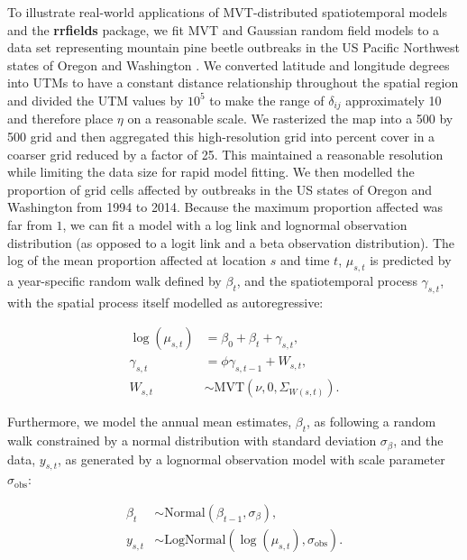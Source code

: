 \documentclass[12pt,english]{article}
\begin{document}
\begin{spacing}{1.3}
To illustrate real-world applications of MVT-distributed
spatiotemporal models and the \textbf{rrfields} package,
we fit MVT and Gaussian random field models
to a data set representing
mountain pine beetle outbreaks in the
US Pacific Northwest states of Oregon and Washington \citep{usdaforestservice2017}.
We converted latitude and longitude degrees into UTMs to have a constant
distance relationship throughout the spatial region and divided the UTM values
by $10^5$ to make the range of $\delta_{ij}$ approximately 10 and therefore
place $\eta$ on a reasonable scale.
We rasterized the map into a 500 by 500 grid
and then aggregated this high-resolution grid
into percent cover in a coarser grid reduced by a factor of 25.
This maintained a reasonable resolution
while limiting the data size for rapid model fitting.
We then modelled the
proportion of grid cells affected by outbreaks
in the US states of Oregon and Washington from 1994 to 2014.
Because the maximum proportion affected was far from $1$, we
can fit a model with a log link and lognormal observation distribution
(as opposed to a logit link and a beta observation distribution).
The log of the mean proportion affected at location $s$ and time $t$, $\mu_{s,t}$
is predicted by a year-specific random walk defined by $\beta_t$,
and the spatiotemporal process $\gamma_{s,t}$,
with the spatial process itself modelled as autoregressive:

\begin{align}
  \log(\mu_{s,t}) &= \beta_0 + \beta_t + \gamma_{s,t},\\
  \gamma_{s,t} &= \phi \gamma_{s,t-1} + W_{s,t},\\ \label{eq:beetle-mu}
  W_{s,t} &\sim \mathrm{MVT}\left(\nu, 0, \Sigma_{W(s,t)}\right).
\end{align}

\noindent Furthermore, we model the annual
mean estimates, $\beta_t$, as following a random walk
constrained by a normal distribution with standard deviation $\sigma_{\beta}$,
and the data, $y_{s,t}$, as generated by a lognormal observation model
with scale parameter $\sigma_{\mathrm{obs}}$:

 \begin{align}
 \beta_t &\sim \mathrm{Normal}\left( \beta_{t-1}, \sigma_{\beta} \right),\\
  y_{s,t} &\sim \mathrm{LogNormal} \left(  \log(\mu_{s,t}), \sigma_{\mathrm{obs}} \right).
 \end{align}


\end{spacing}
\end{document}
